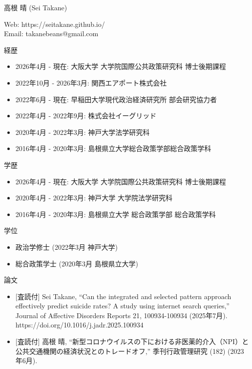 \documentclass[12pt,a4paper]{jlreq}
\begin{document}
\pagestyle{empty}
\noindent
{\Large 高根 晴 (Sei Takane)}

\vspace{0.5em}
\noindent
Web: https://seitakane.github.io/ \\
Email: takanebeans@gmail.com

\vspace{1em}
{\large 経歴}
\begin{itemize}
    \item 2026年4月 - 現在: 大阪大学 大学院国際公共政策研究科 博士後期課程
    \item 2022年10月 - 2026年3月: 関西エアポート株式会社 
    \item 2022年6月 - 現在: 早稲田大学現代政治経済研究所 部会研究協力者
    \item 2022年4月 - 2022年9月: 株式会社イーグリッド 
    \item 2020年4月 - 2022年3月: 神戸大学法学研究科
    \item 2016年4月 - 2020年3月: 島根県立大学総合政策学部総合政策学科
\end{itemize}

\vspace{1em}
{\large 学歴}
\begin{itemize}
    \item 2026年4月 - 現在: 大阪大学 大学院国際公共政策研究科 博士後期課程
    \item 2020年4月 - 2022年3月: 神戸大学 大学院法学研究科
    \item 2016年4月 - 2020年3月: 島根県立大学 総合政策学部 総合政策学科
\end{itemize}

\vspace{1em}
{\large 学位}
\begin{itemize}
    \item 政治学修士 (2022年3月 神戸大学)
    \item 総合政策学士 (2020年3月 島根県立大学)
\end{itemize}

\vspace{1em}
{\large 論文}
\begin{itemize}
    \item {[査読付]} Sei Takane, ``Can the integrated and selected pattern approach effectively predict suicide rates? A study using internet search queries,'' Journal of Affective Disorders Reports 21, 100934-100934 (2025年7月). https://doi.org/10.1016/j.jadr.2025.100934 
    \item {[査読付]} 高根 晴, ``新型コロナウイルスの下における非医薬的介入（NPI）と公共交通機関の経済状況とのトレードオフ,'' 季刊行政管理研究 (182) (2023年6月). 
\end{itemize}
\end{document}
